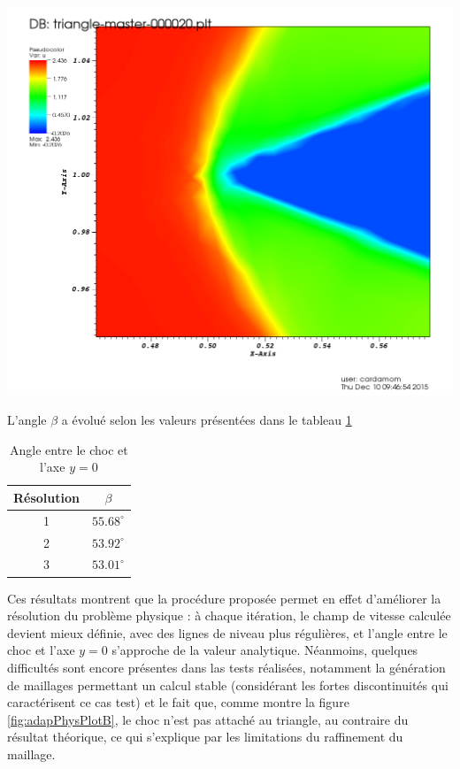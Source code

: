 	\begin{minipage}[t]{1.\linewidth}
		\centering
		\includegraphics[scale=.2]{Bordeaux/figures/AdapPhysique/Plot4bI2B.png}
	\end{minipage}
\endgroup

\indent

\indent L'angle \(\beta\) a évolué selon les valeurs présentées dans le tableau \ref{tab:beta}

\begin{table}[!ht]
	\centering
	\begin{tabular}{c|c}
		Résolution & \(\beta\) \\
		\hline
		1 & \(55.68^\circ\) \\
		2 & \(53.92^\circ\) \\
		3 & \(53.01^\circ\) \\
	\end{tabular}
	\caption{Angle entre le choc et l'axe \(y=0\) \label{tab:beta}}
\end{table}

\indent Ces résultats montrent que la procédure proposée permet en effet d'améliorer la résolution du problème physique : à chaque itération, le champ de vitesse calculée devient mieux définie, avec des lignes de niveau plus régulières, et l'angle entre le choc et l'axe \(y=0\) s'approche de la valeur analytique. Néanmoins, quelques difficultés sont encore présentes dans las tests réalisées, notamment la génération de maillages permettant un calcul stable (considérant les fortes discontinuités qui caractérisent ce cas test) et le fait que, comme montre la figure \ref{fig:adapPhysPlotB}, le choc n'est pas attaché au triangle, au contraire du résultat théorique, ce qui s'explique par les limitations du raffinement du maillage.